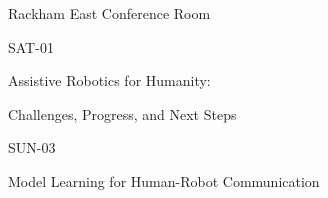 \documentclass{article}
\begin{document}
\rssheader[1in]

\fontsize{32pt}{36pt}
\selectfont
\begin{center}
Rackham East Conference Room
\end{center}

\vfill

\fontsize{48pt}{56pt}
\selectfont
\begin{center}
SAT-01
\end{center}

\fontsize{24pt}{28pt}
\selectfont
\begin{center}
Assistive Robotics for Humanity: \par \noindent Challenges, Progress, and Next Steps
\end{center}

\vfill

\fontsize{48pt}{56pt}
\selectfont
\begin{center}
SUN-03
\end{center}

\fontsize{24pt}{24pt}
\selectfont
\begin{center}
Model Learning for Human-Robot Communication
\end{center}

\vfill
\end{document}

